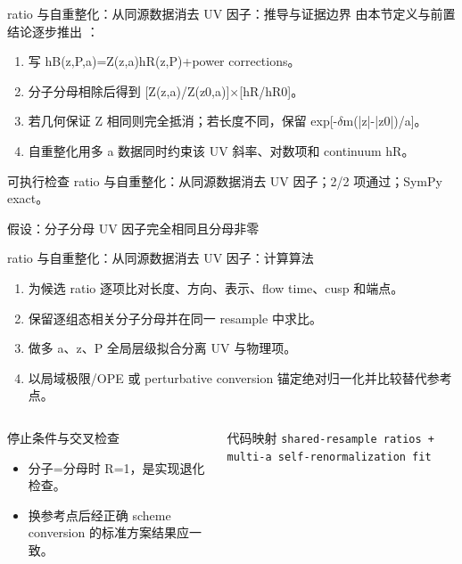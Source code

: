\begin{frame}[t]{ratio 与自重整化：从同源数据消去 UV 因子：推导与证据边界}
\footnotesize
{}\quad 由本节定义与前置结论逐步推出 ：
\begin{enumerate}
\item 写 hB(z,P,a)=Z(z,a)hR(z,P)+power corrections。
\item 分子分母相除后得到 [Z(z,a)/\allowbreak{}Z(z0,a)]\ensuremath{\times}[hR/\allowbreak{}hR0]。
\item 若几何保证 Z 相同则完全抵消；若长度不同，保留 exp[-\ensuremath{\delta}m(|z|-|z0|)/\allowbreak{}a]。
\item 自重整化用多 a 数据同时约束该 UV 斜率、对数项和 continuum hR。
\end{enumerate}\begin{block}{可执行检查}
\quad ratio 与自重整化：从同源数据消去 UV 因子；2/2 项通过；SymPy exact。
\par\scriptsize 假设：分子分母 UV 因子完全相同且分母非零
\end{block}
\end{frame}

\begin{frame}[t]{ratio 与自重整化：从同源数据消去 UV 因子：计算算法}
\footnotesize
{}\begin{enumerate}
\item 为候选 ratio 逐项比对长度、方向、表示、flow time、cusp 和端点。
\item 保留逐组态相关分子分母并在同一 resample 中求比。
\item 做多 a、z、P 全局层级拟合分离 UV 与物理项。
\item 以局域极限/\allowbreak{}OPE 或 perturbative conversion 锚定绝对归一化并比较替代参考点。
\end{enumerate}\begin{columns}[T,onlytextwidth]
\begin{block}{停止条件与交叉检查}\scriptsize\begin{itemize}
\item[\CheckMark] 分子=分母时 R=1，是实现退化检查。
\item[\CheckMark] 换参考点后经正确 scheme conversion 的标准方案结果应一致。
\end{itemize}\end{block}
\begin{block}{代码映射}
\scriptsize \texttt{shared-resample ratios + multi-a self-renormalization fit}
\end{block}\end{columns}\end{frame}

